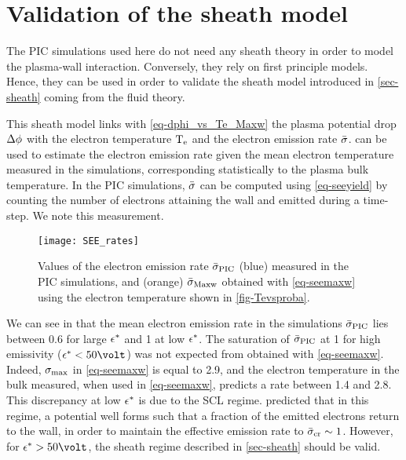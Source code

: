 
\section{Validation of the sheath model }
  \label{sec-sheath_validation}
  
  The \ac{PIC} simulations used here do not need any sheath theory in order to model the plasma-wall interaction.
  Conversely, they rely on first principle models.
  Hence, they can be used in order to validate the sheath model introduced in \cref{sec-sheath} coming from the fluid theory.
  
  This sheath model links with \cref{eq-dphi_vs_Te_Maxw} the plasma potential drop $\Delta \phi$ with the electron temperature $\mathrm{T_e}$ and the electron emission rate $ \bar{\sigma }$.
   can be used to estimate the electron emission rate given the mean electron temperature measured in the simulations, corresponding statistically to the plasma bulk temperature.   
  In the \ac{PIC} simulations, $ \bar{\sigma }$ can be computed using \cref{eq-seeyield} by counting the number of electrons attaining the wall and emitted during a time-step.
  We note \ratepic this measurement.
  \vspace{1em}
   
  \begin{figure}[hbt]
    \centering
    \texttt{[image: SEE\_rates]}
    \caption{Values of the electron emission rate $ \bar{\sigma }_{\rm PIC}$ (blue) measured in the \acs{PIC} simulations, and (orange) $  \bar{\sigma }_{\rm Maxw}$ obtained with \cref{eq-seemaxw} using the electron temperature shown in \cref{fig-Tevsproba}. }
    \label{fig-seeparamesMaxw}
  \end{figure}
  
  
  We can see in  that the mean electron emission rate in the simulations $ \bar{\sigma }_{\rm PIC}$ lies between 0.6 for large $\epsilon^{*}$ and 1 at low $\epsilon^{*}$.
  The saturation of $ \bar{\sigma }_{\rm PIC}$ at 1 for high emissivity ($\crover < 50 \volt$) was not expected from \ratemaxw obtained with \cref{eq-seemaxw}.
  Indeed, $\sigma _{\rm max} $ in \cref{eq-seemaxw} is equal to 2.9, and the electron temperature in the bulk measured, when used in \cref{eq-seemaxw}, predicts a rate between 1.4 and 2.8.
  This discrepancy at low $\epsilon^{*}$ is due to the \ac{SCL} regime.
  \citet{hobbs1967} predicted that in this regime, a potential well forms such that a fraction of the emitted electrons return to the wall, in order to maintain the effective emission rate to $ \bar{\sigma }_{\rm cr}\sim1$.
  However, for $\crover > 50 \volt$, the sheath regime described in \cref{sec-sheath} should be valid.
   

